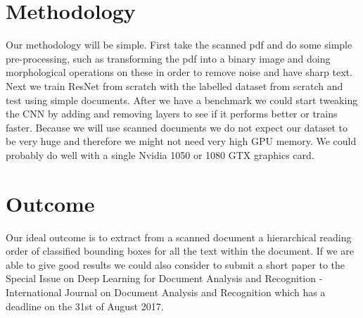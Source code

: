 \documentclass[10pt,twocolumn,letterpaper]{article}
\begin{document}
\section{Methodology}
Our methodology will be simple. First take the scanned pdf and do some simple pre-processing, such as transforming the pdf into a binary image and doing morphological operations on these in order to remove noise and have sharp text.
Next we train ResNet from scratch with the labelled dataset from scratch and test using simple documents. After we have a benchmark we could start tweaking the CNN by adding and removing layers to see if it performs better or trains faster.
Because we will use scanned documents we do not expect our dataset to be very huge and therefore we might not need very high GPU memory. We could probably do well with a single Nvidia 1050 or 1080 GTX graphics card. 

\section{Outcome}
Our ideal outcome is to extract from a scanned document a hierarchical reading order of classified bounding boxes for all the text within the document. If we are able to give good results we could also consider to submit a short paper to the Special Issue on Deep Learning for Document Analysis and Recognition - International Journal on Document Analysis and Recognition which has a deadline on the 31st of August 2017.
{\small


}
\end{document}
